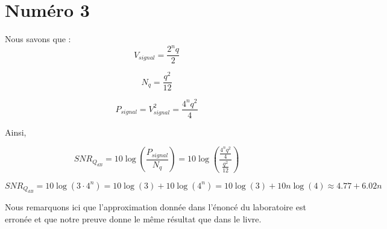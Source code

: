 \section*{Numéro 3}
Nous savons que :
\begin{equation}
	V_{signal} = \frac{2^nq}{2}
\end{equation}

\begin{equation}
	N_q = \frac{q^2}{12}
\end{equation}

\begin{equation}
	P_{signal} = V_{signal}^2 = \frac{4^nq^2}{4}
\end{equation}

Ainsi,

\begin{equation}
	SNR_{Q_{dB}} = 10 \log\left(\frac{P_{signal}}{N_q}\right) = 10 \log\left(\frac{\frac{4^nq^2}{4}}{\frac{q^2}{12}}\right)
\end{equation}

\begin{equation}
	SNR_{Q_{dB}}= 10 \log(3\cdot4^n) = 10\log(3) + 10\log(4^n) = 10\log(3) + 10n\log(4) \approx 4.77 + 6.02n
\end{equation}

Nous remarquons ici que l'approximation donnée dans l'énoncé du laboratoire est erronée et que notre preuve donne le même résultat que dans le livre.


